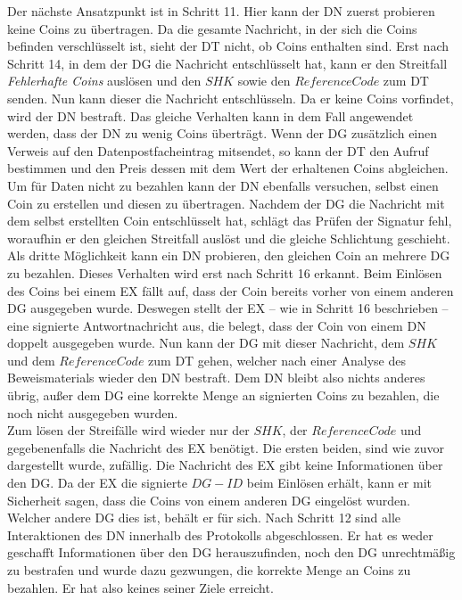 \documentclass[
	fontsize=11pt,
	headings=small,
	parskip=half,           %
	bibliography=totoc,
	numbers=noenddot,       %
	open=any,               %
]{scrreprt}
\begin{document}
Der nächste Ansatzpunkt ist in Schritt 11. Hier kann der DN zuerst probieren keine Coins zu übertragen. Da die gesamte Nachricht, in der sich die Coins befinden verschlüsselt ist, sieht der DT nicht, ob Coins enthalten sind. Erst nach Schritt 14, in dem der DG die Nachricht entschlüsselt hat, kann er den Streitfall \textit{Fehlerhafte Coins} auslösen und den $SHK$ sowie den $ReferenceCode$ zum DT senden. Nun kann dieser die Nachricht entschlüsseln. Da er keine Coins vorfindet, wird der DN bestraft. Das gleiche Verhalten kann in dem Fall angewendet werden, dass der DN zu wenig Coins überträgt. Wenn der DG zusätzlich einen Verweis auf den Datenpostfacheintrag mitsendet, so kann der DT den Aufruf bestimmen und den Preis dessen mit dem Wert der erhaltenen Coins abgleichen. Um für Daten nicht zu bezahlen kann der DN ebenfalls versuchen, selbst einen Coin zu erstellen und diesen zu übertragen. Nachdem der DG die Nachricht mit dem selbst erstellten Coin entschlüsselt hat, schlägt das Prüfen der Signatur fehl, woraufhin er den gleichen Streitfall auslöst und die gleiche Schlichtung geschieht. Als dritte Möglichkeit kann ein DN probieren, den gleichen Coin an mehrere DG zu bezahlen. Dieses Verhalten wird erst nach Schritt 16 erkannt. Beim Einlösen des Coins bei einem EX fällt auf, dass der Coin bereits vorher von einem anderen DG ausgegeben wurde. Deswegen stellt der EX -- wie in Schritt 16 beschrieben -- eine signierte Antwortnachricht aus, die belegt, dass der Coin von einem DN doppelt ausgegeben wurde. Nun kann der DG mit dieser Nachricht, dem $SHK$ und dem $ReferenceCode$ zum DT gehen, welcher nach einer Analyse des Beweismaterials wieder den DN bestraft. Dem DN bleibt also nichts anderes übrig, außer dem DG eine korrekte Menge an signierten Coins zu bezahlen, die noch nicht ausgegeben wurden.\\

Zum lösen der Streifälle wird wieder nur der $SHK$, der $ReferenceCode$ und gegebenenfalls die Nachricht des EX benötigt. Die ersten beiden, sind wie zuvor dargestellt wurde, zufällig. Die Nachricht des EX gibt keine Informationen über den DG. Da der EX die signierte $DG-ID$ beim Einlösen erhält, kann er mit Sicherheit sagen, dass die Coins von einem anderen DG eingelöst wurden. Welcher andere DG dies ist, behält er für sich. Nach Schritt 12 sind alle Interaktionen des DN innerhalb des Protokolls abgeschlossen. Er hat es weder geschafft Informationen über den DG herauszufinden, noch den DG unrechtmäßig zu bestrafen und wurde dazu gezwungen, die korrekte Menge an Coins zu bezahlen. Er hat also keines seiner Ziele erreicht.
\end{document}
